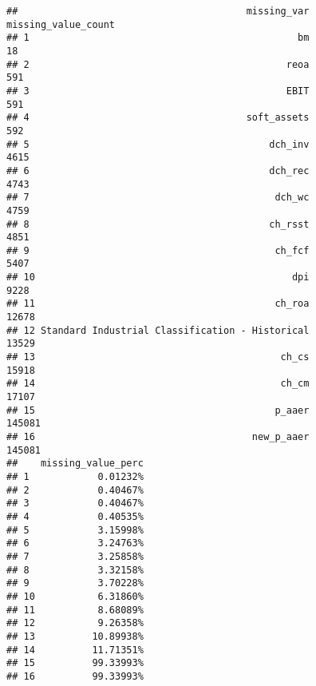 \documentclass[
]{article}
\begin{document}
\begin{verbatim}
##                                        missing_var missing_value_count
## 1                                               bm                  18
## 2                                             reoa                 591
## 3                                             EBIT                 591
## 4                                      soft_assets                 592
## 5                                          dch_inv                4615
## 6                                          dch_rec                4743
## 7                                           dch_wc                4759
## 8                                          ch_rsst                4851
## 9                                           ch_fcf                5407
## 10                                             dpi                9228
## 11                                          ch_roa               12678
## 12 Standard Industrial Classification - Historical               13529
## 13                                           ch_cs               15918
## 14                                           ch_cm               17107
## 15                                          p_aaer              145081
## 16                                      new_p_aaer              145081
##    missing_value_perc
## 1            0.01232%
## 2            0.40467%
## 3            0.40467%
## 4            0.40535%
## 5            3.15998%
## 6            3.24763%
## 7            3.25858%
## 8            3.32158%
## 9            3.70228%
## 10           6.31860%
## 11           8.68089%
## 12           9.26358%
## 13          10.89938%
## 14          11.71351%
## 15          99.33993%
## 16          99.33993%
\end{verbatim}
\end{document}
